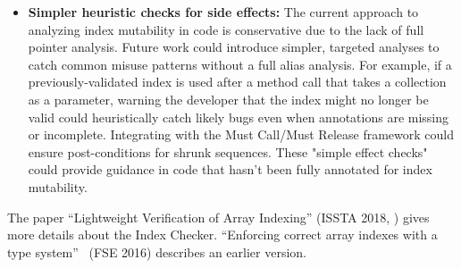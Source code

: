 \begin{itemize}
    \item
      \textbf{Simpler heuristic checks for side effects:}
        The current approach to analyzing index mutability in code is conservative due to the lack of
        full pointer analysis. Future work could introduce simpler, targeted analyses to catch common
        misuse patterns without a full alias analysis. For example, if a previously-validated index
        is used after a method call that takes a collection as a parameter, warning the developer that
        the index might no longer be valid could heuristically catch likely bugs even when annotations
        are missing or incomplete. Integrating with the Must Call/Must Release framework could ensure
        post-conditions for shrunk sequences. These "simple effect checks" could provide guidance in
        code that hasn't been fully annotated for index mutability.
    \end{itemize}



The paper ``Lightweight Verification of Array Indexing'' (ISSTA 2018,
)
gives more details about the Index Checker.
``Enforcing correct array indexes with a type system''~\cite{Santino2016} (FSE 2016) describes
an earlier version.


